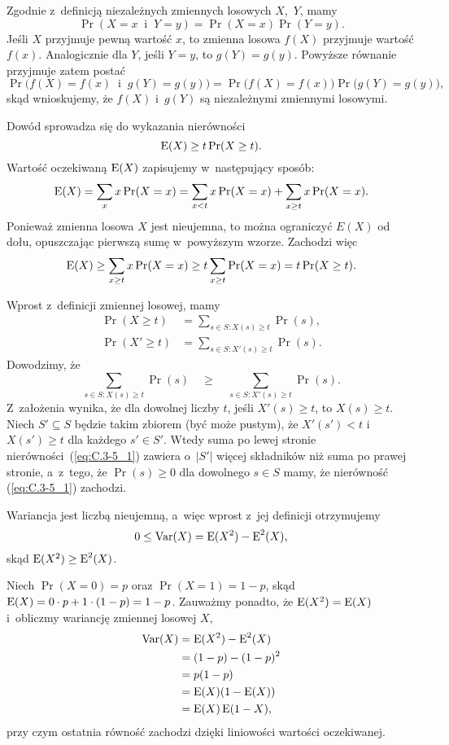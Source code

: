 \exercise{} %
Zgodnie z~definicją niezależnych zmiennych losowych $X$,~$Y$\!, mamy
\[
	\Pr(X=x\;\;\text{i}\;\;Y=y) = \Pr(X=x)\Pr(Y=y).
\]
Jeśli $X$ przyjmuje pewną wartość $x$, to zmienna losowa $f(X)$ przyjmuje wartość $f(x)$. Analogicznie dla $Y$\!, jeśli $Y=y$, to $g(Y)=g(y)$. Powyższe równanie przyjmuje zatem postać
\[
	\Pr\bigl(f(X)=f(x)\;\;\text{i}\;\;g(Y)=g(y)\bigr) = \Pr\bigl(f(X)=f(x)\bigr)\Pr\bigl(g(Y)=g(y)\bigr),
\]
skąd wnioskujemy, że $f(X)$ i~$g(Y)$ są niezależnymi zmiennymi losowymi.

\exercise{} %
Dowód sprowadza się do wykazania nierówności
\[
	\operatorname{E}(X) \ge t\Pr(X\ge t).
\]
Wartość oczekiwaną $\operatorname{E}(X)$ zapisujemy w~następujący sposób:
\[
    \operatorname{E}(X) = \sum_xx\Pr(X=x) = \sum_{x<t}x\Pr(X=x)+\sum_{x\ge t}x\Pr(X=x).
\]
Ponieważ zmienna losowa $X$ jest nieujemna, to można ograniczyć $E(X)$ od dołu, opuszczając pierwszą sumę w~powyższym wzorze. Zachodzi więc
\[
    \operatorname{E}(X) \ge \sum_{x\ge t}x\Pr(X=x) \ge t\sum_{x\ge t}\Pr(X=x) = t\Pr(X\ge t).
\]

\exercise{} %
Wprost z~definicji zmiennej losowej, mamy
\begin{align*}
	\Pr(X\ge t) &= \sum_{s\in S:X(s)\ge t}\Pr(s), \\
	\Pr(X'\ge t) &= \sum_{s\in S:X'(s)\ge t}\Pr(s).
\end{align*}
Dowodzimy, że
\[
	\sum_{s\in S:X(s)\ge t}\Pr(s)\quad \ge \quad\sum_{s\in S:X'(s)\ge t}\Pr(s). \tag{$*$}\label{eq:C.3-5_1}
\]
Z~założenia wynika, że dla dowolnej liczby $t$, jeśli $X'(s)\ge t$, to $X(s)\ge t$. Niech $S'\subseteq S$ będzie takim zbiorem (być może pustym), że $X'(s')<t$ i~$X(s')\ge t$ dla każdego $s'\in S'$. Wtedy suma po lewej stronie nierówności~(\ref{eq:C.3-5_1}) zawiera o~$|S'|$ więcej składników niż suma po prawej stronie, a~z~tego, że $\Pr(s)\ge0$ dla dowolnego $s\in S$ mamy, że nierówność (\ref{eq:C.3-5_1}) zachodzi.

\exercise{} %
Wariancja jest liczbą nieujemną, a~więc wprost z~jej definicji otrzymujemy
\[
	0 \le \operatorname{Var}(X) = \operatorname{E}(X^2)-\operatorname{E}^2(X),
\]
skąd $\operatorname{E}(X^2)\ge\operatorname{E}^2(X)$.

\exercise{} %
Niech $\Pr(X=0)=p$ oraz $\Pr(X=1)=1-p$, skąd $\operatorname{E}(X)=0\cdot p+1\cdot(1-p)=1-p$. Zauważmy ponadto, że $\operatorname{E}(X^2)=\operatorname{E}(X)$ i~obliczmy wariancję zmiennej losowej $X$,
\begin{align*}
	\operatorname{Var}(X) &= \operatorname{E}(X^2)-\operatorname{E}^2(X) \\
	&= (1-p)-(1-p)^2 \\
	&= p(1-p) \\
	&= \operatorname{E}(X)(1-\operatorname{E}(X)) \\
	&= \operatorname{E}(X)\operatorname{E}(1-X),
\end{align*}
przy czym ostatnia równość zachodzi dzięki liniowości wartości oczekiwanej.

